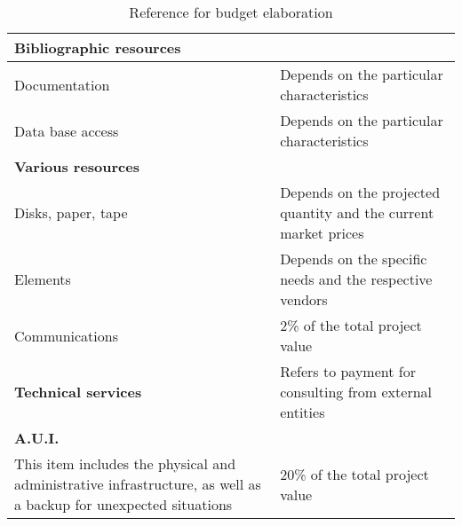 \begin{table}[!ht]
\begin{tabular}{| p{} | p{} |}
        \multicolumn{2}{|l|}{\textbf{Bibliographic resources}} \\
        \hline
        Documentation &
        Depends on the particular characteristics \\
        \hline
        Data base access &
        Depends on the particular characteristics \\
        \hline \hline
        
        \multicolumn{2}{|l|}{\textbf{Various resources}} \\
        \hline
        Disks, paper, tape &
        Depends on the projected quantity and the current market prices \\
        \hline
        Elements &
        Depends on the specific needs and the respective vendors \\
        \hline
        Communications &
        2\% of the total project value \\
        \hline \hline
        
        \textbf{Technical services} &
        Refers to payment for consulting from external entities \\
        \hline \hline
        
        \multicolumn{2}{|l|}{\textbf{A.U.I.}} \\
        \hline
        This item includes the physical and administrative infrastructure, as well as a backup for unexpected situations &
        20\% of the total project value \\
        \hline
        
    \end{tabular}
    \caption{Reference for budget elaboration}
    \label{tab:budget_reference}
\end{table}